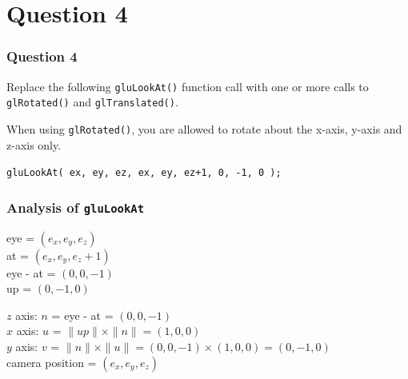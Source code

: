 \documentclass{beamer}
\begin{document}
\section{Question 4}

\begin{frame}
    \frametitle{Question 4}
    Replace the following \texttt{gluLookAt()} function call with one or more calls to 
    \texttt{glRotated()} and \texttt{glTranslated()}.

    When using \texttt{glRotated()}, you are allowed to rotate about the x-axis, 
    y-axis and z-axis only.

    \vspace{1em}

    \begin{tcolorbox}[colback=violet!5!white]
        \centering
        \texttt{gluLookAt( ex, ey, ez, ex, ey, ez+1, 0, -1, 0 );}
    \end{tcolorbox}
\end{frame}

\begin{frame}
    \frametitle{Analysis of \texttt{gluLookAt}}

    eye = $(e_x, e_y, e_z)$\\
    at = $(e_x, e_y, e_z+1)$\\
    eye - at = $(0, 0, -1)$\\
    up = $(0, -1, 0)$\\

    \vspace{1em}

    \begin{tcolorbox}
        $z$ axis: $n$ = eye - at = $(0, 0, -1)$\\
        $x$ axis: $u$ = $\|up\| \times \|n\| = (1, 0, 0)$\\
        $y$ axis: $v$ = $\|n\| \times \|u\| = (0, 0, -1) \times (1, 0, 0) = (0, -1, 0)$\\
        camera position = $(e_x, e_y, e_z)$\\
    \end{tcolorbox}

\end{frame}
\end{document}
